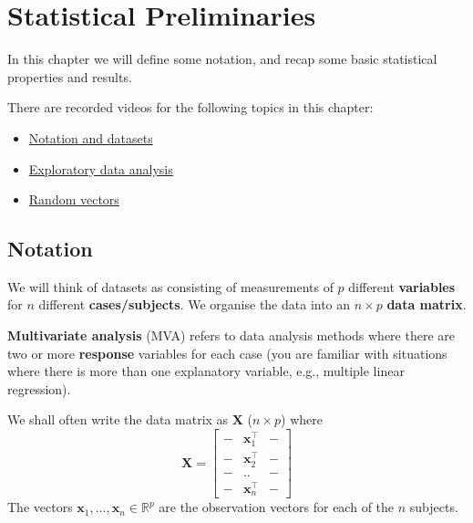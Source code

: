 \documentclass[]{book}
\providecommand{\tightlist}{%
  \setlength{\itemsep}{0pt}\setlength{\parskip}{0pt}}
\theoremstyle{definition}
\theoremstyle{definition}
\theoremstyle{definition}
\theoremstyle{remark}
\begin{document}
\renewcommand{\bs}{\boldsymbol}
\renewcommand{\ds}{\displaystyle}
\renewcommand{\tdiag}{\text{diag}}
\renewcommand{\ttr}{\text{tr}}
\renewcommand{\tmin}{\text{min}}
\renewcommand{\tmax}{\text{max}}
\renewcommand{\tdet}{\text{det}}

\renewcommand{\tcov}{\text{cov}}
\renewcommand{\texp}{\text{exp}}
\renewcommand{\lb}{\left(}
\renewcommand{\rb}{\right)}
\renewcommand{\lsb}{\left[}
\renewcommand{\rsb}{\right]}

\hypertarget{stat-prelim}{%
\chapter{Statistical Preliminaries}\label{stat-prelim}}

In this chapter we will define some notation, and recap some basic statistical properties and results.

There are recorded videos for the following topics in this chapter:

\begin{itemize}
\tightlist
\item
  \href{https://mediaspace.nottingham.ac.uk/media/Notation+and+Datasets/1_p2nas9i4}{Notation and datasets}
\item
  \href{https://mediaspace.nottingham.ac.uk/media/Exploratory+data+analysis/1_seh9o28a}{Exploratory data analysis}
\item
  \href{https://mediaspace.nottingham.ac.uk/media/Random+Vectors/1_fpq4r9wh}{Random vectors}
\end{itemize}

\hypertarget{notation}{%
\section{Notation}\label{notation}}

We will think of datasets as consisting of measurements of \(p\) different \textbf{variables} for \(n\) different \textbf{cases/subjects}. We organise the data into an \(n \times p\) \textbf{data matrix}.

\textbf{Multivariate analysis} (MVA) refers to data analysis methods where there are two or more \textbf{response} variables for each case (you are familiar with situations where there is more than one explanatory variable, e.g., multiple linear regression).

We shall often write the data matrix as \(\mathbf X\) (\(n \times p\)) where
\[
{\mathbf X}=\left[ \begin{array}{ccc}
- &\boldsymbol x_1^\top&-\\
- &\boldsymbol x_2^\top&-\\
- &..&-\\
- &\boldsymbol x_n^\top&-
\end{array}\right ]
\]
The vectors \(\boldsymbol x_1, \ldots , \boldsymbol x_n \in \mathbb{R}^p\) are the observation vectors for each of the \(n\) subjects.
\end{document}
